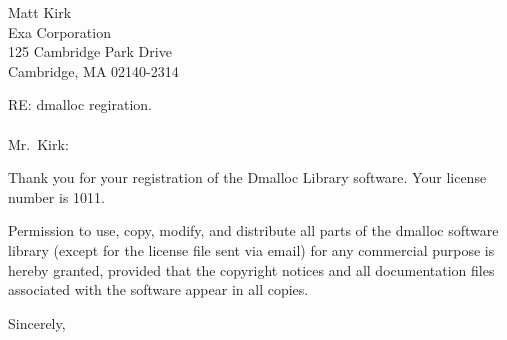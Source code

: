 

%
%

%
%
\address{Dmalloc Software \\
330 Harmar St. \\
Pittsburgh, PA  15219-3748 \\
1.412.687.3221}

\signature{Gray Watson \\
gray@letters.com}
\date{December 19, 1995}


\begin{letter}{Matt Kirk \\
Exa Corporation \\
125 Cambridge Park Drive \\
Cambridge, MA 02140-2314}

\opening{RE: dmalloc regiration. \\
 \\
Mr.\ Kirk:}

Thank you for your registration of the Dmalloc Library software.  Your
license number is 1011.

Permission to use, copy, modify, and distribute all parts of the
dmalloc software library (except for the license file sent via email)
for any commercial purpose is hereby granted, provided that the
copyright notices and all documentation files associated with the
software appear in all copies.

\closing{Sincerely,}

\end{letter}

